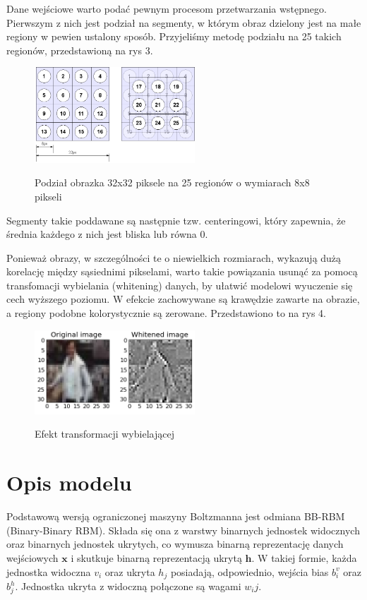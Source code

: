 \documentclass[a4paper,10pt]{report}
\begin{document}
Dane wejściowe warto podać pewnym procesom przetwarzania wstępnego. Pierwszym z nich jest podział na segmenty, w którym obraz dzielony jest na małe regiony w pewien ustalony sposób. Przyjeliśmy metodę podziału na 25 takich regionów, przedstawioną na rys 3.

\begin{figure}
 \centering
 \includegraphics[width=6cm]{imgs/segmentacja.png}
 \label{fig:segmentacja}
 \caption{Podział obrazka 32x32 piksele na 25 regionów o wymiarach 8x8 pikseli \cite{cifar}}
\end{figure}

Segmenty takie poddawane są następnie tzw. centeringowi, który zapewnia, że średnia każdego z nich jest bliska lub równa 0.

Ponieważ obrazy, w szczególności te o niewielkich rozmiarach, wykazują dużą korelację między sąsiednimi pikselami, warto takie powiązania usunąć za pomocą transfomacji wybielania (whitening) danych, by ułatwić modelowi wyuczenie się cech wyższego poziomu. W efekcie zachowywane są krawędzie zawarte na obrazie, a regiony podobne kolorystycznie są zerowane. Przedstawiono to na rys 4.

\begin{figure}
 \centering
 \includegraphics[width=6cm]{imgs/whitening.png}
 \label{fig:whitening}
 \caption{Efekt transformacji wybielającej \cite{melchior2012}}
\end{figure}

\section{Opis modelu}

Podstawową wersją ograniczonej maszyny Boltzmanna jest odmiana BB-RBM (Binary-Binary RBM). Składa się ona z warstwy binarnych jednostek widocznych oraz binarnych jednostek ukrytych, co wymusza binarną reprezentację danych wejściowych $\mathbf{x}$ i skutkuje binarną reprezentacją ukrytą $\mathbf{h}$. W takiej formie, każda jednostka widoczna $v_i$ oraz ukryta $h_j$ posiadają, odpowiednio, wejścia bias $b_i^v$ oraz
$b_j^h$. Jednostka ukryta z widoczną połączone są wagami $w_ij$.
\end{document}
